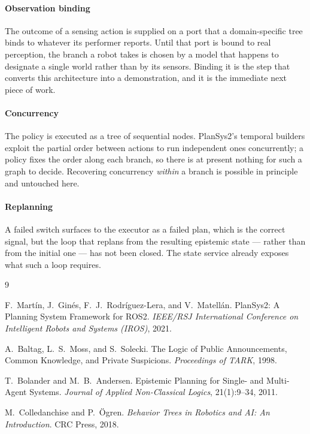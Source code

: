 \documentclass[11pt,a4paper]{article}
\theoremstyle{definition}
\begin{document}
\paragraph{Observation binding} The outcome of a sensing action is supplied on a
port that a domain-specific tree binds to whatever its performer reports. Until
that port is bound to real perception, the branch a robot takes is chosen by a
model that happens to designate a single world rather than by its sensors.
Binding it is the step that converts this architecture into a demonstration, and
it is the immediate next piece of work.

\paragraph{Concurrency} The policy is executed as a tree of sequential nodes.
PlanSys2's temporal builders exploit the partial order between actions to run
independent ones concurrently; a policy fixes the order along each branch, so
there is at present nothing for such a graph to decide. Recovering concurrency
\emph{within} a branch is possible in principle and untouched here.

\paragraph{Replanning} A failed switch surfaces to the executor as a failed plan,
which is the correct signal, but the loop that replans from the resulting
epistemic state --- rather than from the initial one --- has not been closed. The
state service already exposes what such a loop requires.

\begin{thebibliography}{9}
\small

F.~Mart\'in, J.~Gin\'es, F.~J.~Rodr\'iguez-Lera, and V.~Matell\'an.
\newblock PlanSys2: A Planning System Framework for ROS2.
\newblock \emph{IEEE/RSJ International Conference on Intelligent Robots and
Systems (IROS)}, 2021.

A.~Baltag, L.~S.~Moss, and S.~Solecki.
\newblock The Logic of Public Announcements, Common Knowledge, and Private
Suspicions.
\newblock \emph{Proceedings of TARK}, 1998.

T.~Bolander and M.~B.~Andersen.
\newblock Epistemic Planning for Single- and Multi-Agent Systems.
\newblock \emph{Journal of Applied Non-Classical Logics}, 21(1):9--34, 2011.

M.~Colledanchise and P.~\"Ogren.
\newblock \emph{Behavior Trees in Robotics and AI: An Introduction}.
\newblock CRC Press, 2018.

\end{thebibliography}
\end{document}
